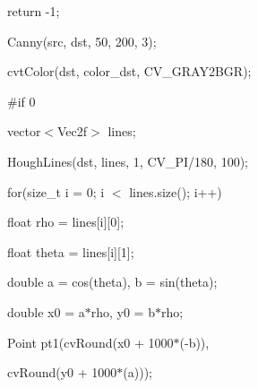 {\ttfamily }

{\ttfamily return -\/1;}

{\ttfamily }

{\ttfamily }

{\ttfamily Canny(src, dst, 50, 200, 3);}

{\ttfamily }

{\ttfamily }

{\ttfamily cvt\+Color(dst, color\+\_\+dst, C\+V\+\_\+\+G\+R\+A\+Y2\+B\+G\+R);}

{\ttfamily }

{\ttfamily }

{\ttfamily \#if 0}

{\ttfamily }

{\ttfamily }

{\ttfamily vector$<$\+Vec2f$>$ lines;}

{\ttfamily }

{\ttfamily }

{\ttfamily Hough\+Lines(dst, lines, 1, C\+V\+\_\+\+P\+I/180, 100);}

{\ttfamily }

{\ttfamily }

{\ttfamily for(size\+\_\+t i = 0; i $<$ lines.\+size(); i++)}

{\ttfamily }

{\ttfamily }

{\ttfamily float rho = lines\mbox{[}i\mbox{]}\mbox{[}0\mbox{]};}

{\ttfamily }

{\ttfamily }

{\ttfamily float theta = lines\mbox{[}i\mbox{]}\mbox{[}1\mbox{]};}

{\ttfamily }

{\ttfamily }

{\ttfamily double a = cos(theta), b = sin(theta);}

{\ttfamily }

{\ttfamily }

{\ttfamily double x0 = a$\ast$rho, y0 = b$\ast$rho;}

{\ttfamily }

{\ttfamily }

{\ttfamily Point pt1(cv\+Round(x0 + 1000$\ast$(-\/b)),}

{\ttfamily }

{\ttfamily }

{\ttfamily cv\+Round(y0 + 1000$\ast$(a)));}

{\ttfamily }

